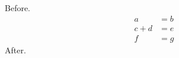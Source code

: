 \documentclass[10pt]{article}
\begin{document}
Before.
\begin{align}
 a &= b \tag{$a_1$}\\
 c + d &= e \\
 f &= g \tag{step $k^2$}
\end{align}
After.
\end{document}
